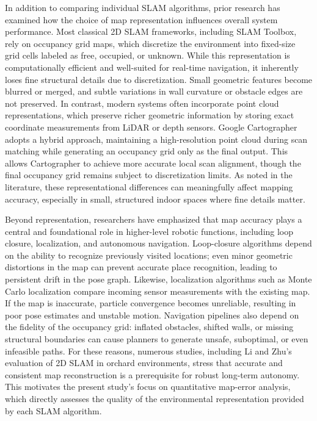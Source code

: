 \documentclass[runningheads,11pt]{llncs_bigfont_absbib}
\begin{document}
In addition to comparing individual SLAM algorithms, prior research has examined how the choice of map representation influences overall system performance. Most classical 2D SLAM frameworks, including SLAM Toolbox, rely on occupancy grid maps, which discretize the environment into fixed-size grid cells labeled as free, occupied, or unknown. While this representation is computationally efficient and well-suited for real-time navigation, it inherently loses fine structural details due to discretization. Small geometric features become blurred or merged, and subtle variations in wall curvature or obstacle edges are not preserved. In contrast, modern systems often incorporate point cloud representations, which preserve richer geometric information by storing exact coordinate measurements from LiDAR or depth sensors. Google Cartographer adopts a hybrid approach, maintaining a high-resolution point cloud during scan matching while generating an occupancy grid only as the final output. This allows Cartographer to achieve more accurate local scan alignment, though the final occupancy grid remains subject to discretization limits. As noted in the literature, these representational differences can meaningfully affect mapping accuracy, especially in small, structured indoor spaces where fine details matter.

Beyond representation, researchers have emphasized that map accuracy plays a central and foundational role in higher-level robotic functions, including loop closure, localization, and autonomous navigation. Loop-closure algorithms depend on the ability to recognize previously visited locations; even minor geometric distortions in the map can prevent accurate place recognition, leading to persistent drift in the pose graph. Likewise, localization algorithms such as Monte Carlo localization compare incoming sensor measurements with the existing map. If the map is inaccurate, particle convergence becomes unreliable, resulting in poor pose estimates and unstable motion. Navigation pipelines also depend on the fidelity of the occupancy grid: inflated obstacles, shifted walls, or missing structural boundaries can cause planners to generate unsafe, suboptimal, or even infeasible paths. For these reasons, numerous studies, including Li and Zhu’s evaluation of 2D SLAM in orchard environments, stress that accurate and consistent map reconstruction is a prerequisite for robust long-term autonomy. This motivates the present study’s focus on quantitative map-error analysis, which directly assesses the quality of the environmental representation provided by each SLAM algorithm.
\end{document}
